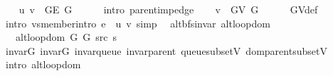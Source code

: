\begin{isabellebody}
\ \ \isamarkupfalse%
\ {\isachardoublequoteopen}{\isacharbraceleft}{\kern0pt}u{\isacharcomma}{\kern0pt}\ v{\isacharbraceright}{\kern0pt}\ {\isasymin}\ G{\isachardot}{\kern0pt}E\ G{\isachardoublequoteclose}\isanewline
\ \ \ \ \isamarkupfalse%
\ {\isacharparenleft}{\kern0pt}intro\ parent{\isacharunderscore}{\kern0pt}imp{\isacharunderscore}{\kern0pt}edge{\isacharparenright}{\kern0pt}\isanewline
\ \ \isamarkupfalse%
\ {\isachardoublequoteopen}v\ {\isasymin}\ G{\isachardot}{\kern0pt}V\ G{\isachardoublequoteclose}\isanewline
\ \ \ \ \isamarkupfalse%
\ G{\isachardot}{\kern0pt}V{\isacharunderscore}{\kern0pt}def\isanewline
\ \ \ \ \isamarkupfalse%
\ {\isacharparenleft}{\kern0pt}intro\ vs{\isacharunderscore}{\kern0pt}member{\isacharunderscore}{\kern0pt}intro{\isacharbrackleft}{\kern0pt}\ {\isacharquery}{\kern0pt}e\ {\isacharequal}{\kern0pt}\ {\isachardoublequoteopen}{\isacharbraceleft}{\kern0pt}u{\isacharcomma}{\kern0pt}\ v{\isacharbraceright}{\kern0pt}{\isachardoublequoteclose}{\isacharbrackright}{\kern0pt}{\isacharparenright}{\kern0pt}\ simp\isanewline
{}\isamarkupfalse%
%
\endisatagproof
{\isafoldproof}%
%
\isadelimproof
\isanewline
%
\endisadelimproof
%
\isadeliminvisible
\isanewline
%
\endisadeliminvisible
%
\isataginvisible
{}\isamarkupfalse%
\ {\isacharparenleft}{\kern0pt}\ alt{\isacharunderscore}{\kern0pt}bfs{\isacharunderscore}{\kern0pt}invar{\isacharparenright}{\kern0pt}\ alt{\isacharunderscore}{\kern0pt}loop{\isacharunderscore}{\kern0pt}dom{\isacharcolon}{\kern0pt}\isanewline
\ \ \ {\isachardoublequoteopen}alt{\isacharunderscore}{\kern0pt}loop{\isacharunderscore}{\kern0pt}dom\ {\isacharparenleft}{\kern0pt}G{}{\isacharcomma}{\kern0pt}\ G{}{\isacharcomma}{\kern0pt}\ src{\isacharcomma}{\kern0pt}\ s{\isacharparenright}{\kern0pt}{\isachardoublequoteclose}%
\endisataginvisible
{\isafoldinvisible}%
%
\isadeliminvisible
\isanewline
%
\endisadeliminvisible
%
\isadelimproof
\ \ %
\endisadelimproof
%
\isatagproof
{}\isamarkupfalse%
\ invar{\isacharunderscore}{\kern0pt}G{}\ invar{\isacharunderscore}{\kern0pt}G{}\ invar{\isacharunderscore}{\kern0pt}queue\ invar{\isacharunderscore}{\kern0pt}parent\ queue{\isacharunderscore}{\kern0pt}subset{\isacharunderscore}{\kern0pt}V\ dom{\isacharunderscore}{\kern0pt}parent{\isacharunderscore}{\kern0pt}subset{\isacharunderscore}{\kern0pt}V\isanewline
\ \ \isamarkupfalse%
\ {\isacharparenleft}{\kern0pt}intro\ alt{\isacharunderscore}{\kern0pt}loop{\isacharunderscore}{\kern0pt}dom{\isacharparenright}{\kern0pt}%

\end{isabellebody}
